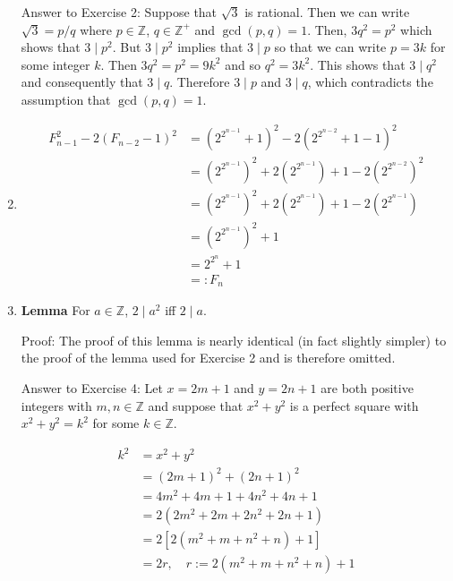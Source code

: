 \documentclass[a4paper]{article}
\begin{document}
\begin{enumerate}
Answer to Exercise 2: Suppose that $\sqrt{3}$ is rational. Then we can write $\sqrt{3} = p / q$ where $p\in \mathbb{Z}$, $q \in \mathbb{Z}^+$ and $\gcd(p,q) = 1$. Then, $3q^2 = p^2$ which shows that $3 \mid p^2$. But $3 \mid p^2$ implies that $3 \mid p$ so that we can write $p = 3k$ for some integer $k$. Then $3q^2 = p^2 = 9k^2$ and so $q^2 = 3k^2$. This shows that $3 \mid q^2$ and consequently that $3 \mid q$. Therefore $3 \mid p$ and $3 \mid q$, which contradicts the assumption that $\gcd(p,q) = 1$. 


\item

\begin{align*}
F_{n-1}^2 - 2(F_{n-2} - 1)^2
&= \left(2^{2^{n-1}} + 1\right)^2 - 2\left(2^{2^{n-2}} + 1 - 1\right)^2 \\
&= \left(2^{2^{n-1}}\right)^2 + 2\left(2^{2^{n-1}}\right) + 1 - 2\left(2^{2^{n-2}}\right)^2 \\
&= \left(2^{2^{n-1}}\right)^2 + 2\left(2^{2^{n-1}}\right) + 1 - 2\left(2^{2^{n-1}}\right) \\
&= \left(2^{2^{n-1}}\right)^2  + 1 \\
&= 2^{2^n} + 1 \\
&=: F_n
\end{align*}


\item

\textbf{Lemma} For $a \in \mathbb{Z}$, $2 \mid a^2$ iff $2 \mid a$.

Proof: The proof of this lemma is nearly identical (in fact slightly simpler) to the proof of the lemma used for Exercise 2 and is therefore omitted. 

Answer to Exercise 4: Let $x = 2m+1$ and $y = 2n+1$ are both positive integers with $m,n \in \mathbb{Z}$ and suppose that $x^2+y^2$ is a perfect square with $x^2 + y^2 = k^2$ for some $k \in \mathbb{Z}$.

\begin{align*}
k^2 &= x^2 + y^2 \\
&= (2m+1)^2 + (2n+1)^2 \\
&= 4m^2 + 4m + 1 + 4n^2 + 4n + 1 \\
&= 2(2m^2 + 2m + 2n^2 + 2n + 1) \\
&= 2[2(m^2 + m + n^2 + n) + 1] \\
&= 2r, \quad r:= 2(m^2 + m + n^2 +n) + 1
\end{align*}


\end{enumerate}
\end{document}
